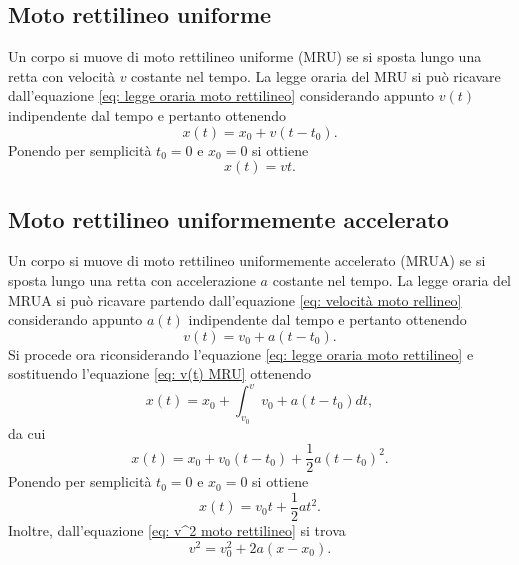 \subsection{Moto rettilineo uniforme}
Un corpo si muove di moto rettilineo uniforme (MRU) se si sposta lungo una retta con velocità $v$ costante nel tempo. La legge oraria del MRU si può ricavare dall'equazione \eqref{eq: legge oraria moto rettilineo} considerando appunto $v(t)$ indipendente dal tempo e pertanto ottenendo
\begin{equation}
\label{eq: legge oraria MRU}
    x(t)=x_0+v(t-t_0).
\end{equation}
Ponendo per semplicità $t_0=0$ e $x_0=0$ si ottiene
\begin{equation}
    x(t)=vt.
\end{equation}

\subsection{Moto rettilineo uniformemente accelerato}
Un corpo si muove di moto rettilineo uniformemente accelerato (MRUA) se si sposta lungo una retta con accelerazione $a$ costante nel tempo. La legge oraria del MRUA si può ricavare partendo dall'equazione \eqref{eq: velocità moto rellineo} considerando appunto $a(t)$ indipendente dal tempo e pertanto ottenendo
\begin{equation}\label{eq: v(t) MRU}
    v(t)=v_0+a(t-t_0).
\end{equation}
Si procede ora riconsiderando l'equazione \eqref{eq: legge oraria moto rettilineo} e sostituendo l'equazione \eqref{eq: v(t) MRU} ottenendo
\begin{equation}
    x(t)=x_0+\int_{v_0}^{v}{v_0+a(t-t_0)dt},
\end{equation}
da cui
\begin{equation}\label{legge oraria MRUA}
    x(t)=x_0+v_0(t-t_0)+\frac{1}{2}a(t-t_0)^2.
\end{equation}
Ponendo per semplicità $t_0=0$ e $x_0=0$ si ottiene
\begin{equation}
    x(t)=v_0t+\frac{1}{2}at^2.
\end{equation}
Inoltre, dall'equazione \eqref{eq: v^2 moto rettilineo} si trova
\begin{equation}
    v^2=v_0^2+2a(x-x_0).
\end{equation}

